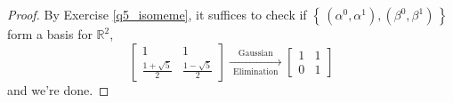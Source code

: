 \documentclass[11pt]{article}
\theoremstyle{definition}
\numberwithin{lemma}{problem}
\numberwithin{equation}{problem}
\newcommand{\R}{\mathbb{R}}
\newcommand{\set}[1]{\left\{\,#1\,\right\}}
\begin{document}
\begin{proof}
    By Exercise \ref{q5_isomeme}, it suffices to check if
    $\set{(\alpha^0, \alpha^1),(\beta^0, \beta^1)}$ form a basis for $\R^2$,
    \[
        \begin{bmatrix}
            1 & 1   \\
            \frac{1+\sqrt{5}}{2} & \frac{1-\sqrt{5}}{2}
        \end{bmatrix}
        \xrightarrow[\text{Elimination}]{\quad \text{Gaussian} \quad}
        \begin{bmatrix}
            1 & 1   \\
            0 & 1
        \end{bmatrix}
    \]
    and we're done.
\end{proof}
\end{document}
